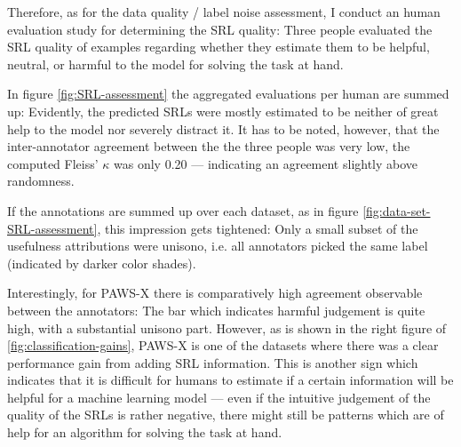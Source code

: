 {Therefore, as for the data quality / label noise assessment, I conduct an human evaluation study
for determining the SRL quality: Three people evaluated the SRL quality of examples regarding
whether they estimate them to be helpful, neutral, or harmful to the model for solving
the task at hand.

In figure \ref{fig:SRL-assessment} the aggregated evaluations per human are summed up:
Evidently, the predicted SRLs were mostly estimated to be neither of great help to the model
nor severely distract it. It has to be noted, however, that the inter-annotator agreement between
the the three people was very low, the computed Fleiss' $\kappa$ was only 0.20 --- indicating
an agreement slightly above randomness.

If the annotations are summed up over each dataset, as in figure \ref{fig:data-set-SRL-assessment},
this impression gets tightened: Only a small subset of the usefulness attributions were unisono,
i.e. all annotators picked the same label (indicated by darker color shades).


Interestingly, for PAWS-X there is comparatively high agreement observable between the annotators:
The bar which indicates harmful judgement is quite high, with a substantial unisono part. However,
as is shown in the right figure of \ref{fig:classification-gains}, PAWS-X is one of the datasets
where there was a clear performance gain from adding SRL information. This is another sign which
indicates that it is difficult for humans to estimate if a certain information will be helpful for
a machine learning model --- even if the intuitive judgement of the quality of the SRLs is rather
negative, there might still be patterns which are of help for an algorithm for solving the task at
hand.






}

